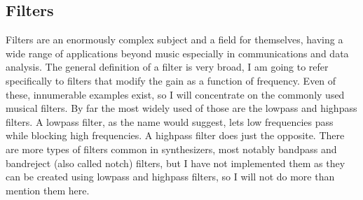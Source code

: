 \documentclass[11pt,a4paper]{article}
\begin{document}
\subsection{Filters}

Filters are an enormously complex subject and a field for themselves, having a wide range of applications beyond music especially in communications and data analysis. The general definition of a filter is very broad, I am going to refer specifically to filters that modify the gain as a function of frequency.
Even of these, innumerable examples exist, so I will concentrate on the commonly used musical filters. By far the most widely used of those are the lowpass and highpass filters.
A lowpass filter, as the name would suggest, lets low frequencies pass while blocking high frequencies. A highpass filter does just the opposite.
There are more types of filters common in synthesizers, most notably bandpass and bandreject (also called notch) filters, but I have not implemented them as they can be created using lowpass and highpass filters, so I will not do more than mention them here.
\end{document}
